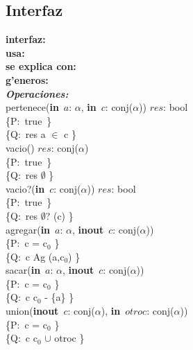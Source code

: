 \documentclass[a4paper,10pt]{article}
\begin{document}
\subsection{Interfaz}

\indent \noindent \textbf{interfaz:} \\
\indent \textbf{usa:}\\
\indent \textbf{se explica con:} \\
\indent \textbf{g'eneros:} \\

\noindent \textbf{\textsl{Operaciones:}}\\

\noindent pertenece(\textbf{in}\ $a$: $\alpha$, \textbf{in}\ $c$: conj($\alpha$))  \en $res$: bool \ \ \ \ \ \\
\indent \{P:\ true\ \}  \\
\indent \{Q:\ res \igobs a $\in$ c \}\\

\noindent vacio()  \en $res$: conj($\alpha$) \ \ \ \ \ \\
\indent \{P:\ true\ \}  \\
\indent \{Q:\ res \igobs $\emptyset$ \}\\

\noindent vacio?(\textbf{in}\ $c$: conj($\alpha$))  \en $res$: bool \ \ \ \ \ \\
\indent \{P:\ true\ \}  \\
\indent \{Q:\ res \igobs $\emptyset$? (c) \}\\


\noindent agregar(\textbf{in}\ $a$: $\alpha$, \textbf{inout}\ $c$: conj($\alpha$))  \ \ \ \ \ \\
\indent \{P:\ c = c$_0$ \}  \\
\indent \{Q:\ c \igobs Ag (a,c$_0$) \}\\

\noindent sacar(\textbf{in}\ $a$: $\alpha$, \textbf{inout}\ $c$: conj($\alpha$))  \ \ \ \ \ \\
\indent \{P:\ c = c$_0$ \}  \\
\indent \{Q:\ c \igobs c$_0$ - \{a\} \}\\

\noindent union(\textbf{inout}\ $c$: conj($\alpha$), \textbf{in}\ $otroc$: conj($\alpha$))  \ \ \ \ \ \\
\indent \{P:\ c = c$_0$ \}  \\
\indent \{Q:\ c \igobs c$_0$ $\cup$ otroc \}\\
\end{document}
